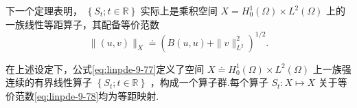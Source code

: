 下一个定理表明， $\left\{  {{S}_{t};t \in  \mathbb{R}}\right\}$ 实际上是乘积空间 $X = {H}_{0}^{1}\left( \Omega \right)  \times  {L}^{2}\left( \Omega \right)$ 上的一族线性等距算子，其配备等价范数
\begin{equation}\tag{9.78}\label{eq:linpde-9-78}
\| \left( {u,v}\right) {\| }_{X} \doteq  {\left( B\left(  u,u\right)   + \| v{\| }_{{L}^{2}}^{2}\right) }^{1/2}.
\end{equation}


\begin{theorem}\label{thm:linpde-9-23}
在上述设定下，公式\eqref{eq:linpde-9-77}定义了空间 $X \doteq  {H}_{0}^{1}\left( \Omega \right)  \times  {L}^{2}\left( \Omega \right)$ 上一族强连续的有界线性算子 $\left\{  {{S}_{t};t \in  \mathbb{R}}\right\}$ ，构成一个算子群.每个算子 ${S}_{t} : X \mapsto  X$ 关于等价范数\eqref{eq:linpde-9-78}均为等距映射.
\end{theorem}


